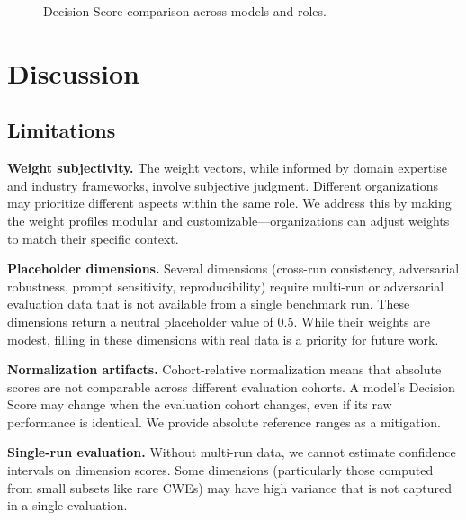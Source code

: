 \documentclass[10pt,twocolumn]{article}
\begin{document}
\begin{figure}[t]
\centering
{}
\caption{Decision Score comparison across models and roles.}
\label{fig:scores}
\end{figure}

\section{Discussion}
\label{sec:discussion}

\subsection{Limitations}

\textbf{Weight subjectivity.} The weight vectors, while informed by domain expertise and industry frameworks, involve subjective judgment. Different organizations may prioritize different aspects within the same role. We address this by making the weight profiles modular and customizable---organizations can adjust weights to match their specific context.

\textbf{Placeholder dimensions.} Several dimensions (cross-run consistency, adversarial robustness, prompt sensitivity, reproducibility) require multi-run or adversarial evaluation data that is not available from a single benchmark run. These dimensions return a neutral placeholder value of 0.5. While their weights are modest, filling in these dimensions with real data is a priority for future work.

\textbf{Normalization artifacts.} Cohort-relative normalization means that absolute scores are not comparable across different evaluation cohorts. A model's Decision Score may change when the evaluation cohort changes, even if its raw performance is identical. We provide absolute reference ranges as a mitigation.

\textbf{Single-run evaluation.} Without multi-run data, we cannot estimate confidence intervals on dimension scores. Some dimensions (particularly those computed from small subsets like rare CWEs) may have high variance that is not captured in a single evaluation.
\end{document}
